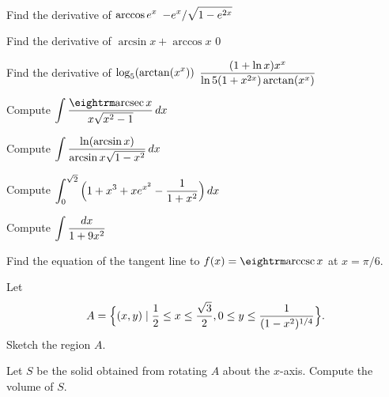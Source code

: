 \exercise Find the derivative of $\displaystyle \arccos e^x$
\answer $\displaystyle-e^x/\sqrt{1-e^{2x}}$
\endanswer
\endexercise

\exercise Find the derivative of $\arcsin x + \arccos x$
\answer $0$
\endanswer
\endexercise

\exercise Find the derivative of $\displaystyle \log _5 (\arctan (x^x ) )$
\answer $\displaystyle {(1+\ln x)x^x\over\ln5(1+x^{2x})\arctan(x^x)}$
\endanswer
\endexercise

\iflatetranscendentals

\exercise Compute $\ds\int {\arcsec x\over x \sqrt{x^2 -1}}\,dx$
\endexercise

\exercise Compute $\displaystyle\int{\ln(\arcsin x )\over\arcsin x \sqrt{1-x^2}}\,dx$

\endexercise

\exercise Compute $\displaystyle\int_0^{\sqrt{2}}\Big(1+ x^3 + xe^{x^2 }-{1\over
  1+x^2}\Big)\,dx$

\endexercise

\exercise Compute $\displaystyle\int {dx\over 1+ 9x^2 }$

\endexercise

\exercise Find the equation of the tangent line to $f(x) =
\arccsc x$ at $x=\pi/6$.

\endexercise

\exercise Let
$$A=\Big\{(x,y)\mid {1\over2}\leq x \leq
{\sqrt{3}\over2}  , 0 \leq y \leq {1\over(1-x^2 )^{1/4}}
\Big\}.
$$
Sketch the region $A$.

\item{} Let $S$ be the solid obtained
from rotating $A$ about the $x$-axis. Compute the volume of $S$.
\endexercise

\filatetranscendentals

\endexercises
